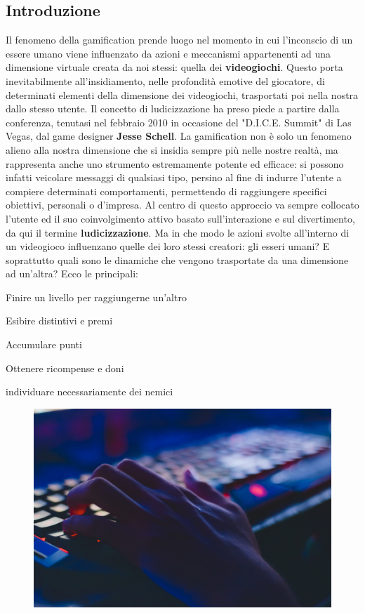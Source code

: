 \subsection{Introduzione}
Il fenomeno della gamification prende luogo nel momento in cui l'inconscio di un essere umano viene influenzato da azioni e meccanismi appartenenti ad una dimensione virtuale creata da noi stessi: quella dei \textbf{videogiochi}. Questo porta inevitabilmente all'insidiamento, nelle profondità emotive del giocatore, di determinati elementi della dimensione dei videogiochi, trasportati poi nella nostra dallo stesso utente.
Il concetto di ludicizzazione ha preso piede a partire dalla conferenza, tenutasi nel febbraio 2010 in occasione del "D.I.C.E. Summit" di Las Vegas, dal game designer \textbf{Jesse Schell}.
La gamification non è solo un fenomeno alieno alla nostra dimensione che si insidia sempre più nelle nostre realtà, ma rappresenta anche uno strumento estremamente potente ed efficace: si possono infatti veicolare messaggi di qualsiasi tipo, persino al fine di indurre l'utente a compiere determinati comportamenti, permettendo di raggiungere specifici obiettivi, personali o d’impresa. Al centro di questo approccio va sempre collocato l’utente ed il suo coinvolgimento attivo basato sull'interazione e sul divertimento, da qui il termine \textbf{ludicizzazione}.
Ma in che modo le azioni svolte all'interno di un videogioco influenzano quelle dei loro stessi creatori: gli esseri umani? E soprattutto quali sono le dinamiche che vengono trasportate da una dimensione ad un'altra? Ecco le principali:

\begin{compactitem}
	\item Finire un livello per raggiungerne un'altro
	\item Esibire distintivi e premi
	\item Accumulare punti
	\item Ottenere ricompense e doni
	\item individuare necessariamente dei nemici
\end{compactitem}


	\begin{figure}[h]
		\begin{center}
		\includegraphics[width=.40\textwidth]{img/image7.jpg}
		\label{gr01}
		\end{center}
	\end{figure}

